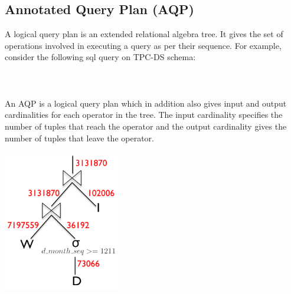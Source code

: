 \documentclass[]{article}
\newenvironment{Figure}
  {\par\medskip\noindent\minipage{\linewidth}}
  {\endminipage\par\medskip}
\begin{document}
\begin{multicols}{2}
	        \subsection{Annotated Query Plan (AQP)}
		A logical query plan is an extended relational algebra tree. It gives the set of operations involved in executing a query as per their sequence. For example, consider the following sql query on TPC-DS schema: 
		\\ \\
		\\ \\
		An AQP is a logical query plan which in addition also gives input and output cardinalities for each operator in the tree. 
		The input cardinality specifies the number of tuples that reach the operator and the output cardinality gives the number of tuples that leave the operator. 

			\begin{Figure}
				\centering
				\includegraphics[width=2in]{figures/alqp1.png}
				\label{fig:mso_bound}
			\end{Figure}


		

\end{multicols}
\end{document}
